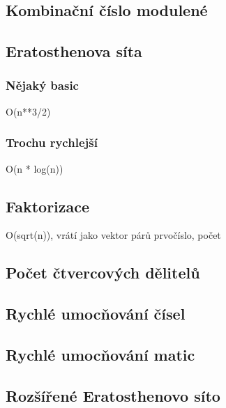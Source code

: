 \documentclass[10pt, a4paper]{article}
\begin{document}
\subsection{Kombinační číslo modulené}


\subsection{Eratosthenova síta}
\subsubsection{Nějaký basic}
O(n**3/2)


\subsubsection{Trochu rychlejší}
O(n * log(n))


\subsection{Faktorizace}
O(sqrt(n)), vrátí jako vektor párů {prvočíslo, počet}


\subsection{Počet čtvercových dělitelů}


\subsection{Rychlé umocňování čísel}



\subsection{Rychlé umocňování matic}


\subsection{Rozšířené Eratosthenovo síto}

\end{document}
